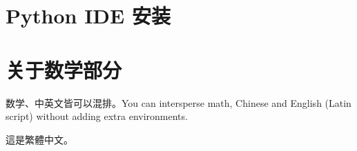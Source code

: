\documentclass[zihao=-4,heading=true,a4paper,twoside,openany]{ctexart}
\begin{document}
\section{Python IDE 安装}


\section*{关于数学部分}
数学、中英文皆可以混排。You can intersperse math, Chinese and English (Latin script) without adding extra environments.

這是繁體中文。
\end{document}

